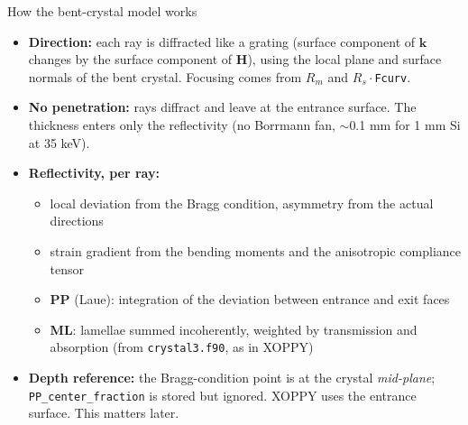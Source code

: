 \documentclass[aspectratio=169,10pt]{beamer}
\begin{document}
\begin{frame}{How the bent-crystal model works}
  \small
  \begin{itemize}
    \item \textbf{Direction:} each ray is diffracted like a grating (surface component of
      $\mathbf{k}$ changes by the surface component of $\mathbf{H}$), using the local
      plane and surface normals of the bent crystal. Focusing comes from $R_m$ and
      $R_s\cdot$\texttt{Fcurv}.
    \item \textbf{No penetration:} rays diffract and leave at the entrance surface.
      The thickness enters only the reflectivity (no Borrmann fan, $\sim$0.1 mm for 1 mm Si at 35 keV).
    \item \textbf{Reflectivity, per ray:}
      \begin{itemize}
        \item local deviation from the Bragg condition, asymmetry from the actual directions
        \item strain gradient from the bending moments and the anisotropic compliance tensor
        \item \textbf{PP} (Laue): integration of the deviation between entrance and exit faces
        \item \textbf{ML}: lamellae summed incoherently, weighted by transmission and absorption
          (from \texttt{crystal3.f90}, as in XOPPY)
      \end{itemize}
    \item \textbf{Depth reference:} the Bragg-condition point is at the crystal
      \emph{mid-plane}; \texttt{PP\_center\_fraction} is stored but ignored.
      XOPPY uses the entrance surface. This matters later.
  \end{itemize}
\end{frame}
\end{document}
